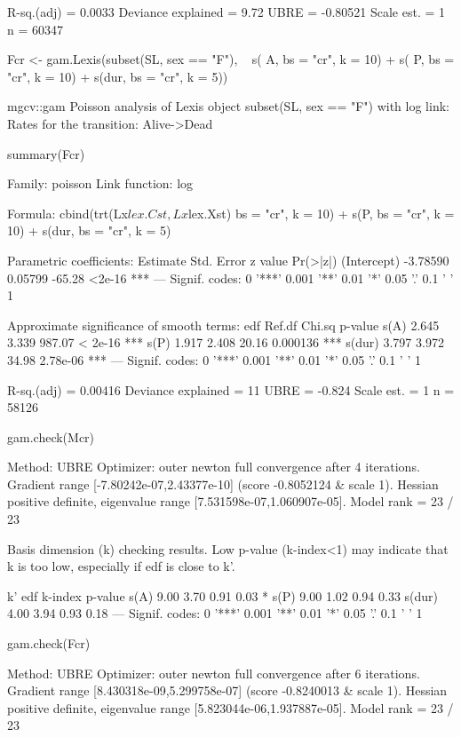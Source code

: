 \begin{enumerate}[resume]
\begin{Schunk}
\begin{Soutput}
R-sq.(adj) =  0.0033   Deviance explained = 9.72%
UBRE = -0.80521  Scale est. = 1         n = 60347
\end{Soutput}
\begin{Sinput}
 Fcr <- gam.Lexis(subset(SL, sex == "F"),
                  ~ s(  A, bs = "cr", k = 10) +
                    s(  P, bs = "cr", k = 10) +
                    s(dur, bs = "cr", k = 5))
\end{Sinput}
\begin{Soutput}
mgcv::gam Poisson analysis of Lexis object subset(SL, sex == "F") with log link:
Rates for the transition:
Alive->Dead
\end{Soutput}
\begin{Sinput}
 summary(Fcr)
\end{Sinput}
\begin{Soutput}
Family: poisson 
Link function: log 

Formula:
cbind(trt(Lx$lex.Cst, Lx$lex.Xst) %in% trnam, Lx$lex.dur) ~ s(A, 
    bs = "cr", k = 10) + s(P, bs = "cr", k = 10) + s(dur, bs = "cr", 
    k = 5)

Parametric coefficients:
            Estimate Std. Error z value Pr(>|z|)    
(Intercept) -3.78590    0.05799  -65.28   <2e-16 ***
---
Signif. codes:  0 '***' 0.001 '**' 0.01 '*' 0.05 '.' 0.1 ' ' 1

Approximate significance of smooth terms:
         edf Ref.df Chi.sq  p-value    
s(A)   2.645  3.339 987.07  < 2e-16 ***
s(P)   1.917  2.408  20.16 0.000136 ***
s(dur) 3.797  3.972  34.98 2.78e-06 ***
---
Signif. codes:  0 '***' 0.001 '**' 0.01 '*' 0.05 '.' 0.1 ' ' 1

R-sq.(adj) =  0.00416   Deviance explained =   11%
UBRE = -0.824  Scale est. = 1         n = 58126
\end{Soutput}
\begin{Sinput}
 gam.check(Mcr)
\end{Sinput}
\begin{Soutput}
Method: UBRE   Optimizer: outer newton
full convergence after 4 iterations.
Gradient range [-7.80242e-07,2.43377e-10]
(score -0.8052124 & scale 1).
Hessian positive definite, eigenvalue range [7.531598e-07,1.060907e-05].
Model rank =  23 / 23 

Basis dimension (k) checking results. Low p-value (k-index<1) may
indicate that k is too low, especially if edf is close to k'.

         k'  edf k-index p-value  
s(A)   9.00 3.70    0.91    0.03 *
s(P)   9.00 1.02    0.94    0.33  
s(dur) 4.00 3.94    0.93    0.18  
---
Signif. codes:  0 '***' 0.001 '**' 0.01 '*' 0.05 '.' 0.1 ' ' 1
\end{Soutput}
\begin{Sinput}
 gam.check(Fcr)
\end{Sinput}
\begin{Soutput}
Method: UBRE   Optimizer: outer newton
full convergence after 6 iterations.
Gradient range [8.430318e-09,5.299758e-07]
(score -0.8240013 & scale 1).
Hessian positive definite, eigenvalue range [5.823044e-06,1.937887e-05].
Model rank =  23 / 23 


\end{Soutput}
\end{Schunk}
\end{enumerate}
